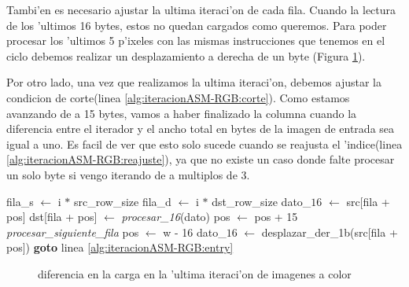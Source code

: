 Tambi'en es necesario ajustar la ultima iteraci'on de cada fila. Cuando la lectura de los 'ultimos 16 bytes, estos no quedan cargados como queremos. Para poder procesar los 'ultimos 5 p'ixeles con las mismas instrucciones que tenemos en el ciclo debemos realizar un desplazamiento a derecha de un byte (Figura \ref{est:ciclo}).

Por otro lado, una vez que realizamos la ultima iteraci'on, debemos ajustar la condicion de corte(linea \ref{alg:iteracionASM-RGB:corte}). Como estamos avanzando de a 15 bytes, vamos a haber finalizado la columna cuando la diferencia entre el iterador y el ancho total en bytes de la imagen de entrada sea igual a uno. Es facil de ver que esto solo sucede cuando se reajusta el 'indice(linea \ref{alg:iteracionASM-RGB:reajuste}), ya que no existe un caso donde falte procesar un solo byte si vengo iterando de a multiplos de 3.

\begin{algorithm}[h!]
\caption{}\label{alg:iteracionASM-RGB}
\begin{algorithmic}[1]
	\STATE fila_s $\leftarrow$ i $*$ src\_row\_size	
	\STATE fila_d $\leftarrow$ i $*$ dst\_row\_size
		\STATE dato_{$16$} $\leftarrow$ src[fila + pos]
		\STATE dst[fila + pos] $\leftarrow$ \textit{procesar_{16}}(dato)
		\label{alg:iteracionASM-RGB:entry}
		\STATE pos $\leftarrow$ pos + 15		
		 		\label{alg:iteracionASM-RGB:corte}
			\STATE \textit{procesar\_siguiente\_fila}
			\STATE pos $\leftarrow$ w - 16 \label{alg:iteracionASM-RGB:reajuste}
			\STATE dato_{$16$} $\leftarrow$ desplazar\_der_{1b}(src[fila + pos]) 
			\STATE \textbf{goto} linea \ref{alg:iteracionASM-RGB:entry}
		\ENDIF		
	\ENDFOR
\ENDFOR
\end{algorithmic}
\end{algorithm}


\begin{figure}[hb]
\caption{diferencia en la carga en la 'ultima iteraci'on de imagenes a color}
\label{est:ciclo}
\end{figure}

